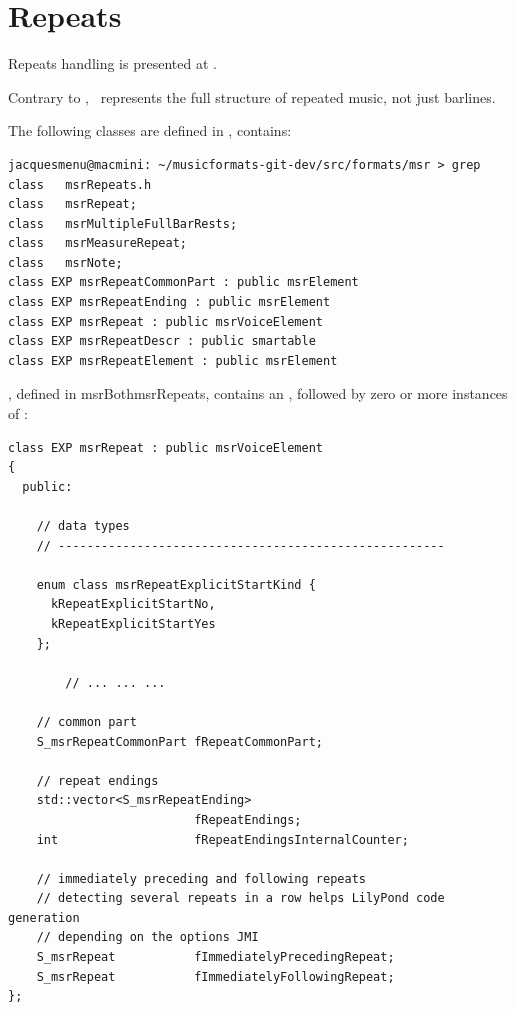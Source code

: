 \section{Repeats}\label{Repeats}

Repeats handling is presented at .

Contrary to \mxml, \mf\ represents the full structure of repeated music, not just barlines.

The following classes are defined in , contains:
\begin{lstlisting}[language=Terminal]
jacquesmenu@macmini: ~/musicformats-git-dev/src/formats/msr > grep class   msrRepeats.h
class   msrRepeat;
class   msrMultipleFullBarRests;
class   msrMeasureRepeat;
class   msrNote;
class EXP msrRepeatCommonPart : public msrElement
class EXP msrRepeatEnding : public msrElement
class EXP msrRepeat : public msrVoiceElement
class EXP msrRepeatDescr : public smartable
class EXP msrRepeatElement : public msrElement
\end{lstlisting}

, defined in msrBoth{msrRepeats}, contains an , followed by zero or more instances of :
\begin{lstlisting}[language=CPlusPlus]
class EXP msrRepeat : public msrVoiceElement
{
  public:

    // data types
    // ------------------------------------------------------

    enum class msrRepeatExplicitStartKind {
      kRepeatExplicitStartNo,
      kRepeatExplicitStartYes
    };

		// ... ... ...

    // common part
    S_msrRepeatCommonPart fRepeatCommonPart;

    // repeat endings
    std::vector<S_msrRepeatEnding>
                          fRepeatEndings;
    int                   fRepeatEndingsInternalCounter;

    // immediately preceding and following repeats
    // detecting several repeats in a row helps LilyPond code generation
    // depending on the options JMI
    S_msrRepeat           fImmediatelyPrecedingRepeat;
    S_msrRepeat           fImmediatelyFollowingRepeat;
};
\end{lstlisting}

